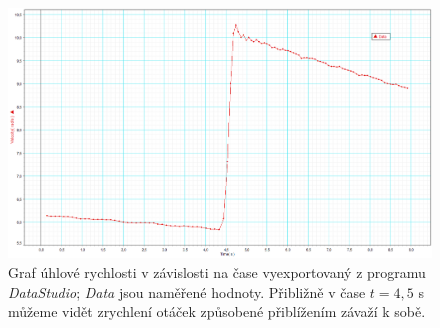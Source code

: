 \documentclass[english]{article}
\begin{document}
	\begin{figure}[h]
	\begin{center}
	    \includegraphics[width=\linewidth]{../prilohy/data.png}
	    	\caption{Graf úhlové rychlosti v závislosti na čase vyexportovaný z programu \emph{DataStudio}; \emph{Data} jsou naměřené hodnoty. Přibližně v čase $t=4,5$ s můžeme vidět zrychlení otáček způsobené přiblížením závaží k sobě.}
			\label{fig:g_zzmh}
	\end{center}
	\end{figure}
	
\end{document}
